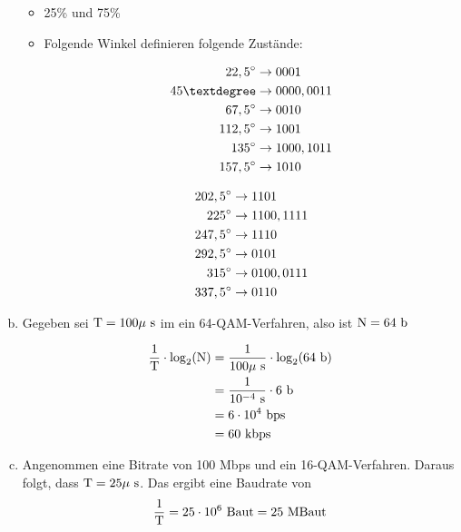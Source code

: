 \begin{enumerate}[a)]
\begin{itemize}
		\item 25\% und 75\%
			
		\item Folgende Winkel definieren folgende Zustände:
		\begin{figure}[!ht] 
			\centering
			\begin{subfigure}[b]{0.4\textwidth}
		\begin{align*}22,5\degr &\to 0001 		\\
			45° &\to 0000, 0011		\\
			67,5\degr &\to 0010		\\
			112,5\degr &\to 1001		\\
			135\degr &\to 1000, 1011		\\
			157,5\degr &\to 1010		
		\end{align*}
			\end{subfigure}
			\begin{subfigure}[b]{0.4\textwidth}
		\begin{align*}202,5^\circ &\to 1101		\\
			225^\circ &\to 1100, 1111		\\
			247,5^\circ &\to 1110		\\
			292,5^\circ &\to 0101		\\
			315^\circ &\to 0100, 0111		\\
			337,5^\circ &\to 0110
		\end{align*}
			\end{subfigure}
		\end{figure}
	\end{itemize}
	
	\item Gegeben sei $\text{T} = 100 \mu \text{ s}$ im ein 64-QAM-Verfahren, also ist $\text{N} = 64\text{ b}$
	
		\begin{align*}
			\frac{1}{\text{T}} \cdot \log_2(\text{N})	&= \frac{1}{100\mu \text{ s}} \cdot \log_2(64\text{ b}) \\
											&= \frac{1}{10^{-4} \text{ s}} \cdot 6\text{ b} \\
											&= 6 \cdot 10^{4}\text{ bps} \\
											&= 60 \text{ kbps} \\
		\end{align*}

	\item Angenommen eine Bitrate von 100 Mbps und ein 16-QAM-Verfahren. Daraus folgt, dass $\text{T} = 25 \mu \text{ s}$. Das ergibt eine Baudrate von $$\frac{1}{\text{T}} = 25\cdot 10^6 \text{ Baut} = 25 \text{ MBaut}$$

\end{enumerate}

